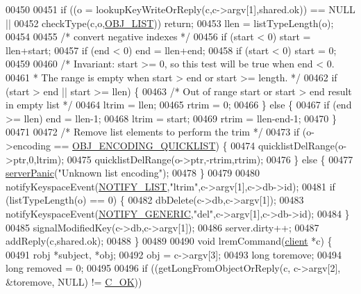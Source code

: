 \begin{DoxyCode}
00450 
00451     \textcolor{keywordflow}{if} ((o = lookupKeyWriteOrReply(c,c->argv[1],shared.ok)) == NULL ||
00452         checkType(c,o,\hyperlink{server_8h_a4a5f22a280949c97a0cb0d4213275126}{OBJ\_LIST})) \textcolor{keywordflow}{return};
00453     llen = listTypeLength(o);
00454 
00455     \textcolor{comment}{/* convert negative indexes */}
00456     \textcolor{keywordflow}{if} (start < 0) start = llen+start;
00457     \textcolor{keywordflow}{if} (end < 0) end = llen+end;
00458     \textcolor{keywordflow}{if} (start < 0) start = 0;
00459 
00460     \textcolor{comment}{/* Invariant: start >= 0, so this test will be true when end < 0.}
00461 \textcolor{comment}{     * The range is empty when start > end or start >= length. */}
00462     \textcolor{keywordflow}{if} (start > end || start >= llen) \{
00463         \textcolor{comment}{/* Out of range start or start > end result in empty list */}
00464         ltrim = llen;
00465         rtrim = 0;
00466     \} \textcolor{keywordflow}{else} \{
00467         \textcolor{keywordflow}{if} (end >= llen) end = llen-1;
00468         ltrim = start;
00469         rtrim = llen-end-1;
00470     \}
00471 
00472     \textcolor{comment}{/* Remove list elements to perform the trim */}
00473     \textcolor{keywordflow}{if} (o->encoding == \hyperlink{server_8h_aec792aeed6d4bf83966672e6a23043b8}{OBJ\_ENCODING\_QUICKLIST}) \{
00474         quicklistDelRange(o->ptr,0,ltrim);
00475         quicklistDelRange(o->ptr,-rtrim,rtrim);
00476     \} \textcolor{keywordflow}{else} \{
00477         \hyperlink{server_8h_a11cc378e7778a830b41240578de3b204}{serverPanic}(\textcolor{stringliteral}{"Unknown list encoding"});
00478     \}
00479 
00480     notifyKeyspaceEvent(\hyperlink{server_8h_a1c0b64c84b0e66dff3554ffe3e2ec4c8}{NOTIFY\_LIST},\textcolor{stringliteral}{"ltrim"},c->argv[1],c->db->id);
00481     \textcolor{keywordflow}{if} (listTypeLength(o) == 0) \{
00482         dbDelete(c->db,c->argv[1]);
00483         notifyKeyspaceEvent(\hyperlink{server_8h_a9fa53dd1068e62365f3964ad3479eec2}{NOTIFY\_GENERIC},\textcolor{stringliteral}{"del"},c->argv[1],c->db->id);
00484     \}
00485     signalModifiedKey(c->db,c->argv[1]);
00486     server.dirty++;
00487     addReply(c,shared.ok);
00488 \}
00489 
00490 \textcolor{keywordtype}{void} lremCommand(\hyperlink{structclient}{client} *c) \{
00491     robj *subject, *obj;
00492     obj = c->argv[3];
00493     \textcolor{keywordtype}{long} toremove;
00494     \textcolor{keywordtype}{long} removed = 0;
00495 
00496     \textcolor{keywordflow}{if} ((getLongFromObjectOrReply(c, c->argv[2], &toremove, NULL) != \hyperlink{server_8h_a303769ef1065076e68731584e758d3e1}{C\_OK}))

\end{DoxyCode}
